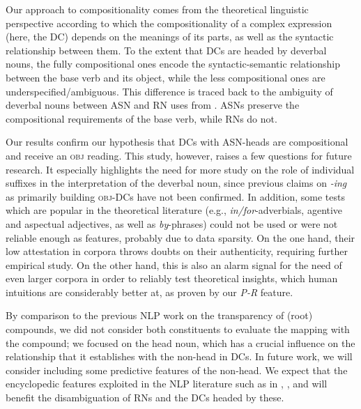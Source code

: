 \documentclass[output=paper]{langsci/langscibook}
\begin{document}
Our approach to compositionality comes from the theoretical linguistic perspective according to which the compositionality of a complex expression (here, the DC) depends on the meanings of its parts, as well as the syntactic relationship between them. To the extent that DCs are headed by deverbal nouns, the fully compositional ones encode the syntactic-semantic relationship between the base verb and its object,  while the less compositional ones are underspecified/ambiguous. This difference is traced back to the ambiguity of deverbal nouns between ASN and RN uses from \cite{grimshaw:90}. ASNs preserve the compositional requirements of the base verb, while RNs do not.


Our results confirm our hypothesis that DCs with ASN-heads are compositional and receive an \textsc{obj} reading. This study, however, raises a few questions for future research. It  especially highlights the need for more study on the role of individual suffixes in the interpretation of the deverbal noun, since previous claims on {\textit{-ing}} as primarily building \textsc{obj}-DCs have not been confirmed. 
In addition, some tests which are popular in the theoretical literature (e.g., \textit{in/for}-adverbials, agentive and aspectual adjectives, as well as \textit{by}-phrases) could not be used  or were not reliable enough as features, probably due to data sparsity.  On the one hand, their low attestation in corpora throws  doubts on their authenticity, requiring further empirical study. On the other hand, this is also an alarm signal for the need of even larger corpora in order to reliably test theoretical insights, which human intuitions are considerably better at, as proven by our \textit{P-R} feature.


By comparison to the previous NLP work on  {the transparency of (root)} compounds, we did not consider both constituents to evaluate the  mapping with the compound; we focused on the head noun, which  has a crucial influence on the relationship that it establishes with the non-head in DCs. In future work, we will consider including some predictive features of the non-head. We expect that the encyclopedic features exploited in the NLP literature such as in \cite{NicholsonBaldwin:06}, \cite{lapata:02}, and \cite{grover:lapata:lascarides:05} will benefit the disambiguation of RNs and the DCs headed by these. 

\newpage
\end{document}
